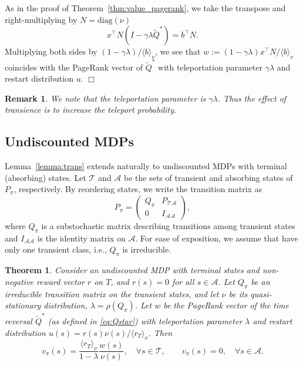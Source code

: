 \documentclass[letterpaper, 10 pt, conference]{ieeeconf}
\newtheorem{remark}{Remark}
\newcommand{\A}{\mathcal{A}}
\newcommand{\T}{\mathcal{T}}
\newtheorem{theorem}{Theorem}
\newtheorem{lemma}{Lemma}
\begin{document}

As in the proof of Theorem~\ref{thm:value_pagerank}, we take the transpose and right-multiplying by $N = \text{diag}(\nu)$
$$
x^\top N (I - \gamma \lambda \widetilde Q^*) = b^\top N.
$$
Multiplying both sides by $(1-\gamma\lambda) / \langle b\rangle_\nu$, we see that 
$w := (1-\gamma\lambda)x^\top N / \langle b\rangle_\nu$ coincides with the PageRank vector of $\widetilde Q^*$ with teleportation parameter $\gamma\lambda$ and restart distribution $u$.
\hfill $\Box$

\begin{remark}
   We note that the teleportation parameter is $\gamma\lambda$. Thus the effect of transience is to increase the teleport probability. 
\end{remark}


\subsection{Undiscounted MDPs}

Lemma~\ref{lemma:trans} extends naturally to undiscounted MDPs with
terminal (absorbing) states.
Let $\T$ and $\A$ be the sets of transient and absorbing states of $P_\pi$, respectively. 
By reordering states, we write the transition matrix as
$$
P_\pi =
\begin{pmatrix}
Q_\pi & P_{\T\A} \\
0 & I_{\A\A}
\end{pmatrix},
$$
where $Q_\pi$ is a substochastic matrix describing transitions among transient states
and $I_{\A\A}$ is the identity matrix on $\A$.
For ease of exposition, we assume that have only one transient class, i.e., $Q_\pi$ is irreducible. 

\begin{theorem}
\label{thm:abs}
Consider an undiscounted MDP with terminal states and non-negative reward vector $r$ on $T$, and $r(s)=0$ for all $s\in \A$.
Let $Q_\pi$ be an irreducible transition matrix on the transient states, and let
$\nu$ be its quasi-stationary distribution, $\lambda = \rho(Q_\pi)$.
Let $w$ be the PageRank vector of the time reversal $\widetilde Q^*$ (as defined in \eqref{eq:Qstar}) with teleportation
parameter $\lambda$ and restart distribution $u(s) = r(s)\nu(s) / \langle r_T\rangle_\nu$.
Then
$$
v_\pi(s) = \frac{\langle r_T\rangle_\nu}{1-\lambda}\frac{w(s)}{\nu(s)}, \quad \forall s \in \T,
\qquad
v_\pi(s) = 0, \quad \forall s \in \A .
$$
\end{theorem}
\end{document}
